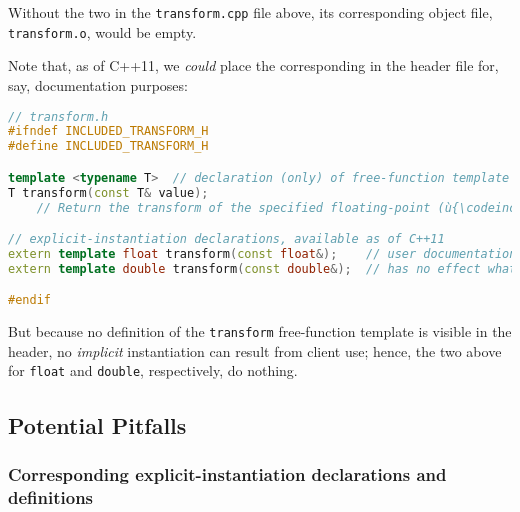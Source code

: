 \noindent Without the two  in
the \lstinline!transform.cpp! file above, its corresponding object file,
\lstinline!transform.o!, would be empty.

Note that, as of C++11, we \emph{could} place the corresponding
 in the header file
for, say, documentation purposes:

\begin{lstlisting}[language=C++]
// transform.h
#ifndef INCLUDED_TRANSFORM_H
#define INCLUDED_TRANSFORM_H

template <typename T>  // declaration (only) of free-function template
T transform(const T& value);
    // Return the transform of the specified floating-point (ù{\codeincomments{value}}ù).

// explicit-instantiation declarations, available as of C++11
extern template float transform(const float&);    // user documentation only;
extern template double transform(const double&);  // has no effect whatsoever

#endif
\end{lstlisting}
    
\noindent But because no definition of the \lstinline!transform! free-function
template is visible in the header, no \emph{implicit} instantiation can
result from client use; hence, the two  above for \lstinline!float! and \lstinline!double!,
respectively, do nothing.

\subsection[Potential Pitfalls]{Potential Pitfalls}\label{potential-pitfalls-externtemplate}

\subsubsection[Corresponding explicit-instantiation declarations and definitions]{Corresponding explicit-instantiation declarations and definitions}\label{corresponding-explicit-instantiation-declarations-and-definitions}


